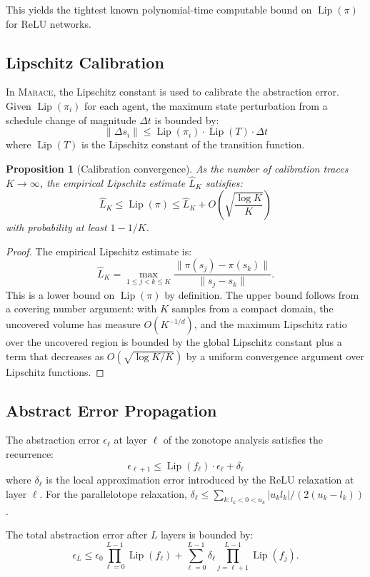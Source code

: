 \documentclass[11pt]{article}
\newtheorem{proposition}[theorem]{Proposition}
\newcommand{\abs}[1]{\lvert #1 \rvert}
\newcommand{\norm}[1]{\lVert #1 \rVert}
\newcommand{\marace}{\textsc{Marace}}
\DeclareMathOperator{\Lip}{Lip}
\begin{document}
This yields the tightest known polynomial-time computable bound on $\Lip(\pi)$
for ReLU networks.

\subsection{Lipschitz Calibration}

In \marace{}, the Lipschitz constant is used to calibrate the abstraction
error. Given $\Lip(\pi_i)$ for each agent, the maximum state perturbation
from a schedule change of magnitude $\Delta t$ is bounded by:
\[
  \norm{\Delta s_i} \leq \Lip(\pi_i) \cdot \Lip(T) \cdot \Delta t
\]
where $\Lip(T)$ is the Lipschitz constant of the transition function.

\begin{proposition}[Calibration convergence]
\label{prop:calibration}
As the number of calibration traces $K \to \infty$, the empirical
Lipschitz estimate $\hat{L}_K$ satisfies:
\[
  \hat{L}_K \leq \Lip(\pi) \leq \hat{L}_K + O\!\left(\sqrt{\frac{\log K}{K}}\right)
\]
with probability at least $1 - 1/K$.
\end{proposition}

\begin{proof}
The empirical Lipschitz estimate is:
\[
  \hat{L}_K = \max_{1 \leq j < k \leq K}
  \frac{\norm{\pi(s_j) - \pi(s_k)}}{\norm{s_j - s_k}}.
\]
This is a lower bound on $\Lip(\pi)$ by definition. The upper bound follows
from a covering number argument: with $K$ samples from a compact domain,
the uncovered volume has measure $O(K^{-1/d})$, and the maximum Lipschitz
ratio over the uncovered region is bounded by the global Lipschitz constant
plus a term that decreases as $O(\sqrt{\log K / K})$ by a uniform convergence
argument over Lipschitz functions.
\end{proof}

\subsection{Abstract Error Propagation}

The abstraction error $\epsilon_\ell$ at layer $\ell$ of the zonotope
analysis satisfies the recurrence:
\[
  \epsilon_{\ell+1} \leq \Lip(f_\ell) \cdot \epsilon_\ell + \delta_\ell
\]
where $\delta_\ell$ is the local approximation error introduced by the
ReLU relaxation at layer $\ell$. For the parallelotope relaxation,
$\delta_\ell \leq \sum_{k: l_k < 0 < u_k} \abs{u_k l_k} / (2(u_k - l_k))$.

The total abstraction error after $L$ layers is bounded by:
\[
  \epsilon_L \leq \epsilon_0 \prod_{\ell=0}^{L-1} \Lip(f_\ell)
  + \sum_{\ell=0}^{L-1} \delta_\ell \prod_{j=\ell+1}^{L-1} \Lip(f_j).
\]
\end{document}
